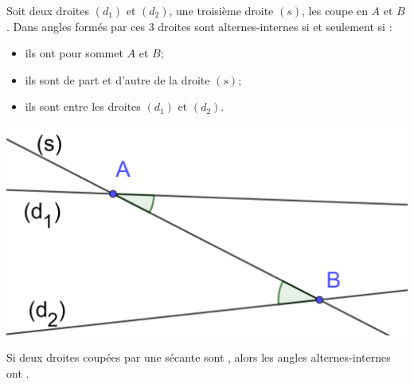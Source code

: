 \documentclass[12pt,a4paper]{article}
\begin{document}
\begin{mydef}
	
	
		Soit deux droites $(d_1)$ et $(d_2)$, une troisième droite $(s)$, les coupe en $A$ et $B$.
		Dans angles formés par ces 3 droites sont alternes-internes si et seulement si :
		
		\begin{multicols}{2}
		\begin{itemize}
			\item ils ont pour sommet $A$ et $B$;
			\item ils sont de part et d'autre de la droite $(s)$;
			\item ils sont entre les droites $(d_1)$ et $(d_2)$.
		\end{itemize}
	
	
		\begin{center}
			\includegraphics[scale=0.14]{alt_int}
		\end{center}
	\end{multicols}

\end{mydef}


\begin{myprop}
	Si deux droites coupées par une sécante sont , alors les angles alternes-internes ont .
\end{myprop}
\end{document}
